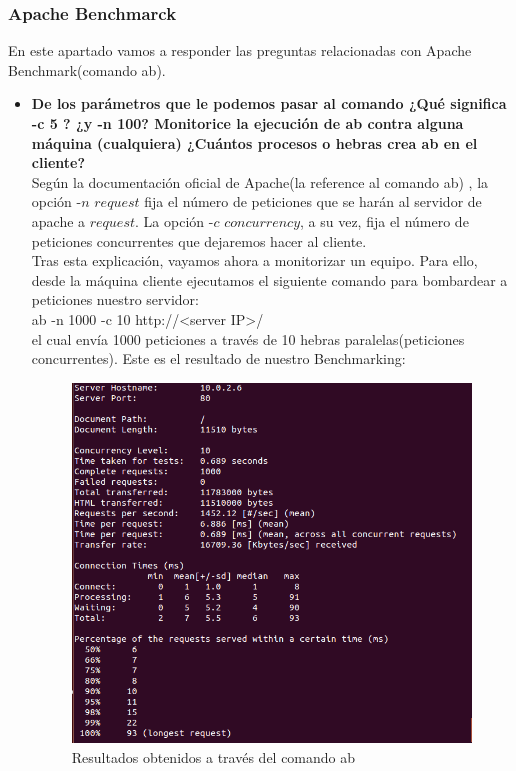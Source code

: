 \subsubsection{Apache Benchmarck}
En este apartado vamos a responder las preguntas relacionadas con Apache Benchmark(comando ab).\\
\begin{itemize}
	\item \textbf{De los parámetros que le podemos pasar al comando ¿Qué significa -c 5 ? ¿y -n 100? Monitorice la ejecución de ab contra alguna máquina (cualquiera) ¿Cuántos procesos o hebras crea ab en el cliente?}\\
	Según la documentación oficial de Apache(la reference al comando ab) \cite{ab}, la opción -$n$ $request$ fija el número de peticiones que se harán al servidor de apache a $request$. La opción -$c$ $concurrency$, a su vez, fija el número de peticiones concurrentes que dejaremos hacer al cliente. \\
	
	Tras esta explicación, vayamos ahora a monitorizar un equipo. Para ello, desde la máquina cliente ejecutamos el siguiente comando para bombardear a peticiones nuestro servidor:\\
	
	ab -n 1000 -c 10 http://<server IP>/\\
	
	el cual envía 1000 peticiones a través de 10 hebras paralelas(peticiones concurrentes). Este es el resultado de nuestro Benchmarking:\\
	
	\begin{figure}[H]
		\centering
		\includegraphics[width=0.7\linewidth]{Ejecucion-ab}
		\caption[Ejecucion ab]{Resultados obtenidos a través del comando ab}
		\label{fig:Ejecucion-ab}
	\end{figure}
	

\end{itemize}
